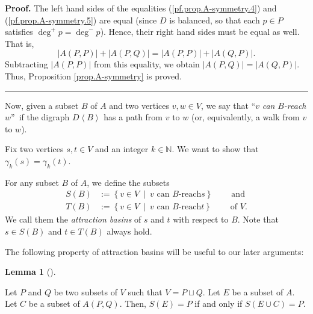 \documentclass[numbers=enddot,12pt,final,onecolumn,notitlepage]{scrartcl}%
\theoremstyle{definition}
\newtheorem{lem}[theo]{Lemma}
\newenvironment{lemma}[1][]
{\begin{lem}[#1]\begin{leftbar}}
{\end{leftbar}\end{lem}}
\newenvironment{proof}[1][Proof]{\noindent\textbf{#1.} }{\ \rule{0.5em}{0.5em}}
\theoremstyle{plainsl}
\begin{document}
\begin{proof}
The left hand sides of the equalities (\ref{pf.prop.A-symmetry.4}) and
(\ref{pf.prop.A-symmetry.5}) are equal (since $D$ is balanced, so that each
$p\in P$ satisfies $\deg^{+}p=\deg^{-}p$). Hence, their right hand sides must
be equal as well. That is,%
\[
\left\vert A\left(  P,P\right)  \right\vert +\left\vert A\left(  P,Q\right)
\right\vert =\left\vert A\left(  P,P\right)  \right\vert +\left\vert A\left(
Q,P\right)  \right\vert .
\]
Subtracting $\left\vert A\left(  P,P\right)  \right\vert $ from this equality,
we obtain $\left\vert A\left(  P,Q\right)  \right\vert =\left\vert A\left(
Q,P\right)  \right\vert $. Thus, Proposition \ref{prop.A-symmetry} is proved.
\end{proof}

Now, given a subset $B$ of $A$ and two vertices $v,w\in V$, we say that
\textquotedblleft$v$ \emph{can }$B$\emph{-reach} $w$\textquotedblright\ if the
digraph $D\left\langle B\right\rangle $ has a path from $v$ to $w$ (or,
equivalently, a walk from $v$ to $w$).

Fix two vertices $s,t\in V$ and an integer $k\in\mathbb{N}$. We want to show
that $\gamma_{k}\left(  s\right)  =\gamma_{k}\left(  t\right)  $.

For any subset $B$ of $A$, we define the subsets%
\begin{align*}
S\left(  B\right)   &  :=\left\{  v\in V\ \mid\ v\text{ can }B\text{-reach
}s\right\}  \ \ \ \ \ \ \ \ \ \ \text{and}\\
T\left(  B\right)   &  :=\left\{  v\in V\ \mid\ v\text{ can }B\text{-reach
}t\right\}  \ \ \ \ \ \ \ \ \ \ \text{of }V.
\end{align*}
We call them the \emph{attraction basins} of $s$ and $t$ with respect to $B$.
Note that $s\in S\left(  B\right)  $ and $t\in T\left(  B\right)  $ always hold.

The following property of attraction basins will be useful to our later arguments:

\begin{lemma}
\label{lem.new0}Let $P$ and $Q$ be two subsets of $V$ such that $V=P\sqcup Q$.
Let $E$ be a subset of $A$. Let $C$ be a subset of $A\left(  P,Q\right)  $.
Then, $S\left(  E\right)  =P$ if and only if $S\left(  E\cup C\right)  =P$.
\end{lemma}
\end{document}
